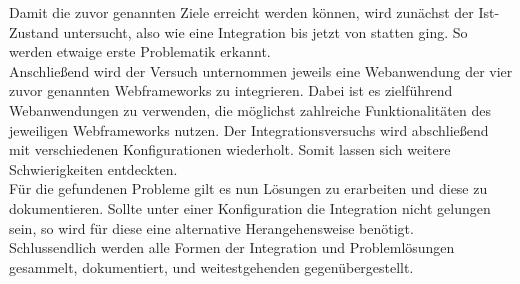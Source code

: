 Damit die zuvor genannten Ziele erreicht werden können, wird zunächst der Ist-Zustand untersucht, also wie eine Integration bis jetzt von statten ging. So werden etwaige erste Problematik erkannt.\\
Anschließend wird der Versuch unternommen jeweils eine Webanwendung der vier zuvor genannten Webframeworks zu integrieren. Dabei ist es zielführend Webanwendungen zu verwenden, die möglichst zahlreiche Funktionalitäten des jeweiligen Webframeworks nutzen. Der Integrationsversuchs wird abschließend mit verschiedenen Konfigurationen wiederholt.  Somit lassen sich weitere Schwierigkeiten entdeckten. \\
Für die gefundenen Probleme gilt es nun Lösungen zu erarbeiten und diese zu dokumentieren. Sollte unter einer Konfiguration die Integration nicht gelungen sein, so wird für diese eine alternative Herangehensweise benötigt.\\
Schlussendlich werden alle Formen der Integration und Problemlösungen gesammelt, dokumentiert, und weitestgehenden gegenübergestellt.



